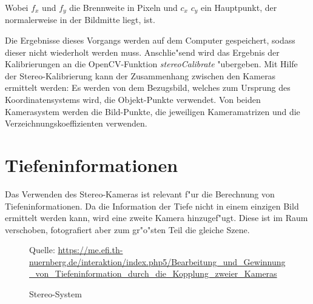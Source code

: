 \newpage

\noindent Wobei $f_{x}$ und $f_{y}$ die Brennweite in Pixeln und $c_{x}$ $c_{y}$ ein Hauptpunkt, der normalerweise in der Bildmitte liegt, ist.

\noindent Die Ergebnisse dieses Vorgangs werden auf dem Computer gespeichert, sodass dieser nicht wiederholt werden muss. Anschlie"send wird das Ergebnis der Kalibrierungen an die OpenCV-Funktion \textit{stereoCalibrate} "ubergeben.\newline
Mit Hilfe der Stereo-Kalibrierung kann der Zusammenhang zwischen den Kameras ermittelt werden: Es werden von dem Bezugsbild, welches zum Ursprung des Koordinatensystems wird, die Objekt-Punkte verwendet. Von beiden Kamerasystem werden die Bild-Punkte, die jeweiligen Kameramatrizen und die Verzeichnungskoeffizienten verwenden.

\section{Tiefeninformationen}
\label{sec:tiefeninformationen}

\noindent Das Verwenden des Stereo-Kameras ist relevant f"ur die Berechnung von Tiefeninformationen. Da die Information der Tiefe nicht in einem einzigen Bild ermittelt werden kann, wird eine zweite Kamera hinzugef"ugt. Diese ist im Raum verschoben, fotografiert aber zum gr"o"sten Teil die gleiche Szene.

\begin{figure}%
	\centering
	\qquad
	\caption{Stereo-System}%
	\small Quelle: \url{https://me.efi.th-nuernberg.de/interaktion/index.php5/Bearbeitung_und_Gewinnung_von_Tiefeninformation_durch_die_Kopplung_zweier_Kameras}
	\label{fig:stereo}%
\end{figure}

